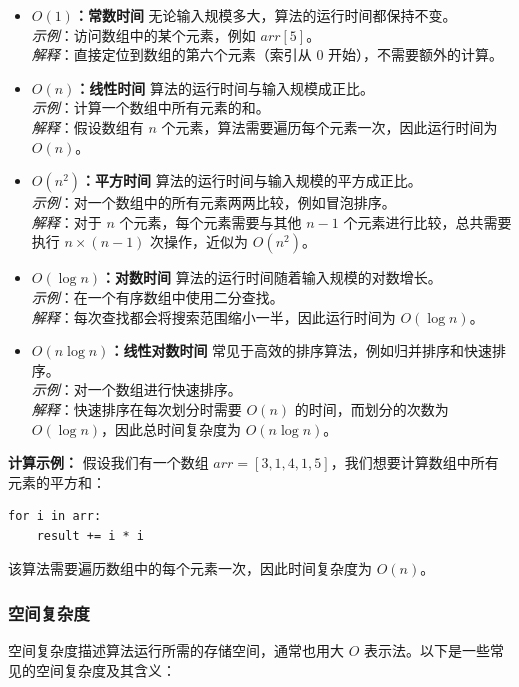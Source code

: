 \documentclass[lang=cn,newtx,10pt,scheme=chinese]{../elegantbook}
\begin{document}
\begin{itemize}
    \item \textbf{$O(1)$：常数时间}
    无论输入规模多大，算法的运行时间都保持不变。\\
    \textit{示例}：访问数组中的某个元素，例如 $arr[5]$。\\
    \textit{解释}：直接定位到数组的第六个元素（索引从 0 开始），不需要额外的计算。

    \item \textbf{$O(n)$：线性时间}
    算法的运行时间与输入规模成正比。\\
    \textit{示例}：计算一个数组中所有元素的和。\\
    \textit{解释}：假设数组有 $n$ 个元素，算法需要遍历每个元素一次，因此运行时间为 $O(n)$。

    \item \textbf{$O(n^2)$：平方时间}
    算法的运行时间与输入规模的平方成正比。\\
    \textit{示例}：对一个数组中的所有元素两两比较，例如冒泡排序。\\
    \textit{解释}：对于 $n$ 个元素，每个元素需要与其他 $n-1$ 个元素进行比较，总共需要执行 $n \times (n-1)$ 次操作，近似为 $O(n^2)$。

    \item \textbf{$O(\log n)$：对数时间}
    算法的运行时间随着输入规模的对数增长。\\
    \textit{示例}：在一个有序数组中使用二分查找。\\
    \textit{解释}：每次查找都会将搜索范围缩小一半，因此运行时间为 $O(\log n)$。

    \item \textbf{$O(n \log n)$：线性对数时间}
    常见于高效的排序算法，例如归并排序和快速排序。\\
    \textit{示例}：对一个数组进行快速排序。\\
    \textit{解释}：快速排序在每次划分时需要 $O(n)$ 的时间，而划分的次数为 $O(\log n)$，因此总时间复杂度为 $O(n \log n)$。
\end{itemize}

\textbf{计算示例：}
假设我们有一个数组 $arr = [3, 1, 4, 1, 5]$，我们想要计算数组中所有元素的平方和：
\begin{verbatim}
for i in arr:
    result += i * i
\end{verbatim}
该算法需要遍历数组中的每个元素一次，因此时间复杂度为 $O(n)$。

\subsubsection{空间复杂度}
空间复杂度描述算法运行所需的存储空间，通常也用大 $O$ 表示法。以下是一些常见的空间复杂度及其含义：
\end{document}

